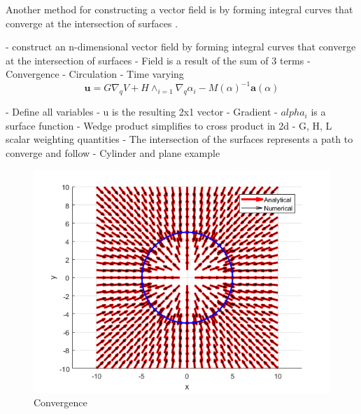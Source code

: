 \documentclass[numbered,pdftex]{ohio-etd}
\begin{document}
%
%
%

Another method for constructing a vector field is by forming integral curves that converge at the intersection of surfaces \cite{goncalves_artificial_2009}. 

- construct an n-dimensional vector field by forming integral curves that converge at the intersection of surfaces
- Field is a result of the sum of 3 terms
- Convergence
- Circulation
- Time varying\\


\begin{equation}\label{gonFieldeq}
\boldsymbol{u} = G\nabla_qV+H\wedge_{i=1}\nabla_q\alpha_i - M(\alpha)^{-1}\boldsymbol{a}(\alpha)
\end{equation}

- Define all variables
- u is the resulting 2x1 vector
- Gradient
- $alpha_i$ is a surface function
- Wedge product simplifies to cross product in 2d
- G, H, L scalar weighting quantities 
- The intersection of the surfaces represents a path to converge and follow
- Cylinder and plane example


\begin{figure}[h]
	\centering
	\includegraphics[width=0.7\linewidth]{PaperFigures/convergence}
	\caption{Convergence}
	\label{fig:convergence}
	
\end{figure}
\end{document}
